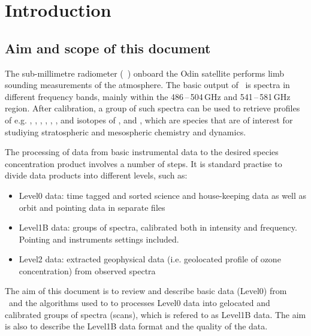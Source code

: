 \chapter{Introduction}
\label{chapter:introduction}

\setcounter{page}{1}


\section{Aim and scope of this document}
\label{sec:aim}

The sub-millimetre radiometer (\SMR\ ) onboard the Odin satellite
performs limb sounding measurements of the atmosphere.
The basic output of \smr\ is spectra in different frequency
bands, mainly within the 486\,--\,504\,GHz and 541\,--\,581\,GHz region.
After calibration, a group of such spectra can be used
to retrieve profiles of e.g. , , , , 
, , and isotopes of , and ,
which are species that are of interest for studiying stratospheric and 
mesospheric chemistry and dynamics. 

The processing of data from basic instrumental data to the
desired species concentration product involves a number of steps.
It is standard practise to divide data products into different levels, such  as:

\begin{itemize}

\item Level0 data: time tagged and sorted science and house-keeping data
as well as orbit and pointing data in separate files

\item Level1B data: groups of spectra, calibrated both in intensity and frequency. 
Pointing and instruments settings included.

\item Level2 data: extracted geophysical data (i.e. geolocated profile
of ozone concentration) from observed spectra

\end{itemize}


The aim of this document is to review and describe basic
data (Level0) from \smr\ and the algorithms used to 
to processes Level0 data into gelocated and calibrated 
groups of spectra (scans), which is refered to as Level1B data. 
The aim is also to describe the Level1B data format and 
the quality of the data.

